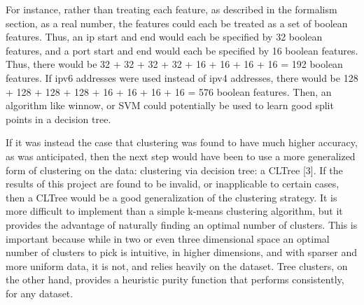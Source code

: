 \documentclass[11pt,letterpaper]{article}
\begin{document}
For instance, rather than treating each feature, as described in the formalism section, as a real number, the features could each be treated as a set of boolean features. Thus, an ip start and end would each be specified by 32 boolean features, and a port start and end would each be specified by 16 boolean features. Thus, there would be 32 + 32 + 32 + 32 + 16 + 16 + 16 + 16 = 192 boolean features. If ipv6 addresses were used instead of ipv4 addresses, there would be 128 + 128 + 128 + 128 + 16 + 16 + 16 + 16 = 576 boolean features. Then, an algorithm like winnow, or SVM could potentially be used to learn good split points in a decision tree. 

If it was instead the case that clustering was found to have much higher accuracy, as was anticipated, then the next step would have been to use a more generalized form of clustering on the data: clustering via decision tree: a CLTree [3]. If the results of this project are found to be invalid, or inapplicable to certain cases, then a CLTree would be a good generalization of the clustering strategy. It is more difficult to implement than a simple k-means clustering algorithm, but it provides the advantage of naturally finding an optimal number of clusters. This is important because while in two or even three dimensional space an optimal number of clusters to pick is intuitive, in higher dimensions, and with sparser and more uniform data, it is not, and relies heavily on the dataset. Tree clusters, on the other hand, provides a heuristic purity function that performs consistently, for any dataset. 
\end{document}
